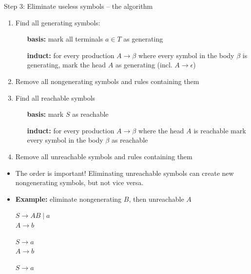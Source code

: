 \documentclass[handout]{beamer}
\begin{document}
\begin{frame}{Step 3: Eliminate useless symbols -- the algorithm}

	\begin{enumerate}
		\item Find all generating symbols:
		\begin{itemize}
			\item[\textbf{basis:}] mark all terminals $a\in T$ as generating
			\item[\textbf{induct:}] for every production $A\to\beta$ where every symbol in the body $\beta$ is generating, mark the head $A$ as generating (incl. $A\to \epsilon$)
		\end{itemize}
		\item Remove all \alert{nongenerating} symbols and rules containing them
		\item Find all reachable symbols
		\begin{itemize}
			\item[\textbf{basis:}] mark $S$ as reachable
			\item[\textbf{induct:}] for every production $A\to\beta$ where the head $A$ is reachable mark every symbol in the body $\beta$ as reachable
		\end{itemize}
		\item Remove all \alert{unreachable} symbols and rules containing them		
	\end{enumerate}

	\begin{itemize}
		\item The order is important! Eliminating unreachable symbols can create new nongenerating symbols, but not vice versa.
		\item \textbf{Example:} eliminate nongenerating $B$, then unreachable $A$
		\smallskip
		\begin{center}
			\begin{minipage}{0.25\textwidth}
				$S\to AB\mid a$\\
				$A\to b$
			\end{minipage}
			\begin{minipage}{0.25\textwidth}
				$S\to a$\\
				$A\to b$
			\end{minipage}
			\begin{minipage}{0.25\textwidth}
				$S\to a$
			\end{minipage}
		\end{center}
	\end{itemize}

\end{frame}
\end{document}

